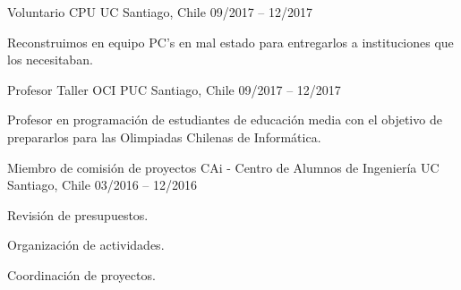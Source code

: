\begin{cventries}
  \cventry
    {Voluntario} %
    {CPU UC} %
    {Santiago, Chile} %
    {09/2017 – 12/2017} %
    {
      \begin{cvitems} %
        \item {Reconstruimos en equipo PC's en mal estado para entregarlos a instituciones que los necesitaban.}
      \end{cvitems}
    }

  \cventry
    {Profesor} %
    {Taller OCI PUC} %
    {Santiago, Chile} %
    {09/2017 – 12/2017} %
    {
      \begin{cvitems} %
        \item {Profesor en programación de estudiantes de educación media con el objetivo de prepararlos para las Olimpiadas Chilenas de Informática.}
      \end{cvitems}
    }

\cventry
  {Miembro de comisión de proyectos} %
  {CAi - Centro de Alumnos de Ingeniería UC} %
  {Santiago, Chile} %
  {03/2016 – 12/2016} %
  {
    \begin{cvitems} %
      \item {Revisión de presupuestos.}
      \item {Organización de actividades.}
      \item {Coordinación de proyectos.}
    \end{cvitems}
  }

\end{cventries}
